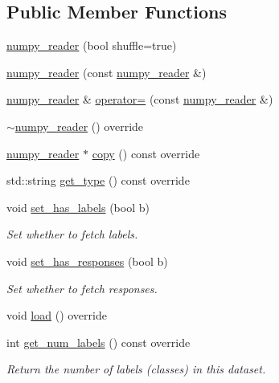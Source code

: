 \subsection*{Public Member Functions}
\begin{DoxyCompactItemize}
\item 
\hyperlink{classlbann_1_1numpy__reader_a77718f4e8fad1e74289e5d446587ba83}{numpy\+\_\+reader} (bool shuffle=true)
\item 
\hyperlink{classlbann_1_1numpy__reader_a815062116605538898e9289ce2ec55ef}{numpy\+\_\+reader} (const \hyperlink{classlbann_1_1numpy__reader}{numpy\+\_\+reader} \&)
\item 
\hyperlink{classlbann_1_1numpy__reader}{numpy\+\_\+reader} \& \hyperlink{classlbann_1_1numpy__reader_acaa3bec8f120bd5a905219378f663cda}{operator=} (const \hyperlink{classlbann_1_1numpy__reader}{numpy\+\_\+reader} \&)
\item 
\hyperlink{classlbann_1_1numpy__reader_a9837face3a5bf4abe1e47c032b1210de}{$\sim$numpy\+\_\+reader} () override
\item 
\hyperlink{classlbann_1_1numpy__reader}{numpy\+\_\+reader} $\ast$ \hyperlink{classlbann_1_1numpy__reader_a86bebc5eb7869d1df5e8cca76f503069}{copy} () const override
\item 
std\+::string \hyperlink{classlbann_1_1numpy__reader_a4c26b0cdc9c5c4b09c127e0ab6a72cf6}{get\+\_\+type} () const override
\item 
void \hyperlink{classlbann_1_1numpy__reader_ae5f6ee086fbf0fa91d029808d454c1f0}{set\+\_\+has\+\_\+labels} (bool b)
\begin{DoxyCompactList}\small\item\em Set whether to fetch labels. \end{DoxyCompactList}\item 
void \hyperlink{classlbann_1_1numpy__reader_a511981e78b175345b6b8a84b5f688774}{set\+\_\+has\+\_\+responses} (bool b)
\begin{DoxyCompactList}\small\item\em Set whether to fetch responses. \end{DoxyCompactList}\item 
void \hyperlink{classlbann_1_1numpy__reader_aafc34d19b30845d54175911d143349de}{load} () override
\item 
int \hyperlink{classlbann_1_1numpy__reader_a87510cf16928dc2d5451b10a72d47ce9}{get\+\_\+num\+\_\+labels} () const override
\begin{DoxyCompactList}\small\item\em Return the number of labels (classes) in this dataset. \end{DoxyCompactList}\item 

\end{DoxyCompactItemize}
